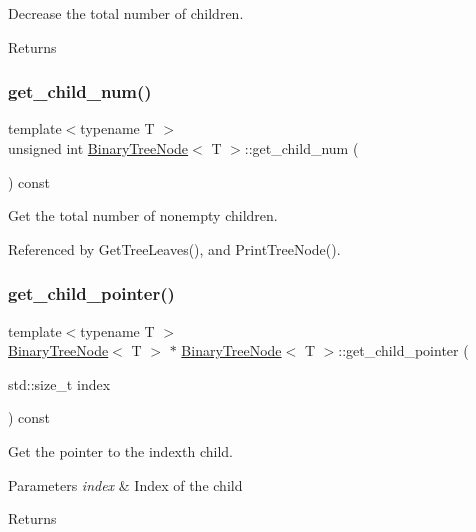 Decrease the total number of children. \begin{DoxyReturn}{Returns}

\end{DoxyReturn}
\mbox{\label{classBinaryTreeNode_a41d03ea4bdbb686094273fa47c7f988a}} 
\subsubsection{\texorpdfstring{get\+\_\+child\+\_\+num()}{get\_child\_num()}}
{\footnotesize\ttfamily template$<$typename T $>$ \\
unsigned int \hyperlink{classBinaryTreeNode}{Binary\+Tree\+Node}$<$ T $>$\+::get\+\_\+child\+\_\+num (\begin{DoxyParamCaption}{ }\end{DoxyParamCaption}) const}

Get the total number of nonempty children. 

Referenced by Get\+Tree\+Leaves(), and Print\+Tree\+Node().

\mbox{\label{classBinaryTreeNode_a2ef0648ec3a937f4153a877b0e47eaa5}} 
\subsubsection{\texorpdfstring{get\+\_\+child\+\_\+pointer()}{get\_child\_pointer()}}
{\footnotesize\ttfamily template$<$typename T $>$ \\
\hyperlink{classBinaryTreeNode}{Binary\+Tree\+Node}$<$ T $>$ $\ast$ \hyperlink{classBinaryTreeNode}{Binary\+Tree\+Node}$<$ T $>$\+::get\+\_\+child\+\_\+pointer (\begin{DoxyParamCaption}\item[{std\+::size\+\_\+t}]{index }\end{DoxyParamCaption}) const}

Get the pointer to the {\ttfamily index\textquotesingle{}th} child. 
\begin{DoxyParams}{Parameters}
{\em index} & Index of the child \\
\hline
\end{DoxyParams}
\begin{DoxyReturn}{Returns}

\end{DoxyReturn}
\mbox{\label{classBinaryTreeNode_aee6acddfb9686de160994b81a32faa80}} 
